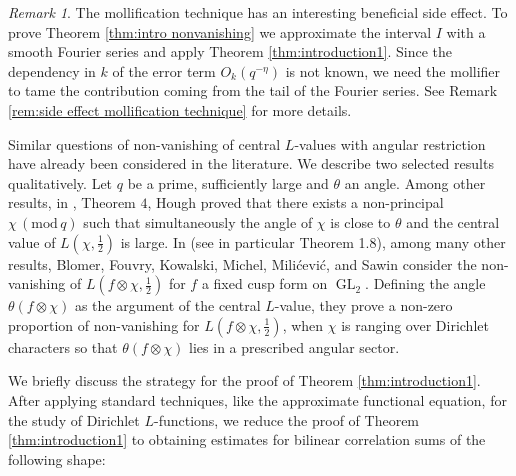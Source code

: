 \documentclass[12pt]{amsart}
\theoremstyle{plain}
\theoremstyle{definition}
\theoremstyle{remark}
\newtheorem{rem}[thm]{Remark}
\numberwithin{equation}{section}
\newcommand{\mods}[1]{\,(\mathrm{mod}\,{#1})}
\begin{document}
\begin{rem}
    The mollification technique has an interesting beneficial side effect. To prove Theorem \ref{thm:intro nonvanishing} we approximate the interval $I$ with a smooth Fourier series and apply Theorem \ref{thm:introduction1}. Since the dependency in $k$ of the error term $O_k(q^{-\eta})$ is not known, we need the mollifier to tame the contribution coming from the tail of the Fourier series. See Remark \ref{rem:side effect mollification technique} for more details.
\end{rem}

Similar questions of non-vanishing of central $L$-values with angular restriction have already been considered in the literature. We describe two selected results qualitatively. Let $q$ be a prime, sufficiently large and $\theta$ an angle. Among other results, in \cite{Hough}, Theorem $4$, Hough proved that there exists a non-principal $\chi \mods{q}$ such that simultaneously the angle of $\chi$ is close to $\theta$ and the central value of $L(\chi,\tfrac{1}{2})$ is large. 
In \cite{Blomeretal} (see in particular Theorem 1.8), among many other results, Blomer, Fouvry, Kowalski, Michel, Mili\'cevi\'c, and Sawin consider the non-vanishing of $L(f\otimes \chi,\tfrac{1}{2})$ for $f$ a fixed cusp form on $\operatorname{GL}_2$. Defining the angle $\theta(f\otimes \chi)$ as the argument of the central $L$-value, they prove a non-zero proportion of non-vanishing for $L(f\otimes \chi,\tfrac{1}{2})$, when $\chi$ is ranging over Dirichlet characters so that $\theta(f\otimes \chi)$ lies in a prescribed angular sector. 
 


We briefly discuss the strategy for the proof of Theorem \ref{thm:introduction1}. After applying standard techniques, like the approximate functional equation, for the study of Dirichlet $L$-functions, we reduce the proof of Theorem \ref{thm:introduction1} to obtaining estimates for bilinear correlation sums of the following shape:
\end{document}

